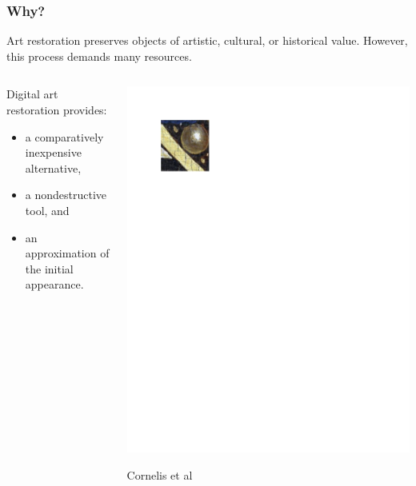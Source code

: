 \documentclass{beamer}
\begin{document}
\begin{frame}
\frametitle{Why?}
Art restoration preserves objects of artistic, cultural, or historical value.
\linebreak
However, this process demands many resources.
\begin{columns}
\begin{column}{0.5\textwidth}
Digital art restoration provides:
\begin{itemize}
\item a comparatively inexpensive alternative,
\item a nondestructive tool, and
\item an approximation of the initial appearance.
\end{itemize}
\end{column}
\begin{column}{0.5\textwidth}
\includegraphics[width=1\textwidth,trim={0.5in 8.4in 5.5in 0.75in},clip]{ghent_altarpiece_original}
\begin{center}
{\tiny Cornelis et al}
\end{center}
\end{column}
\end{columns}
\end{frame}
\end{document}

